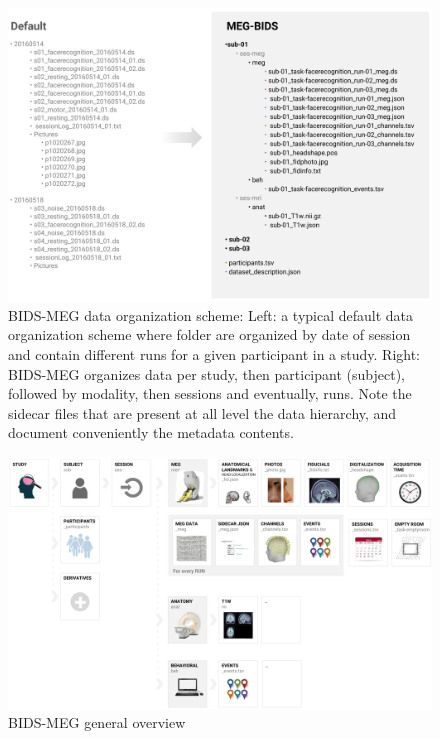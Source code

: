 \begin{figure}[htb!]
\begin{center}
   \includegraphics[width=\linewidth]{figures/bids_organization.png}
\end{center}
   \caption[BIDS-MEG data organization scheme.]{BIDS-MEG data organization scheme: Left: a typical default data organization scheme where folder are organized by date of session and contain different runs for a given participant in a study. Right: BIDS-MEG organizes data per study, then participant (subject), followed by modality, then sessions and eventually, runs. Note the sidecar files that are present at all level the data hierarchy, and document conveniently the metadata contents.}
   \label{fig:BIDS-MEG-organization}
\end{figure}


\begin{figure}
\begin{center}
   \includegraphics[width=\linewidth]{figures/bids_structure.png}
\end{center}
   \caption[BIDS-MEG data organization scheme.]{ BIDS-MEG general overview}
   \label{fig:BIDS-MEG-overview}
\end{figure}

